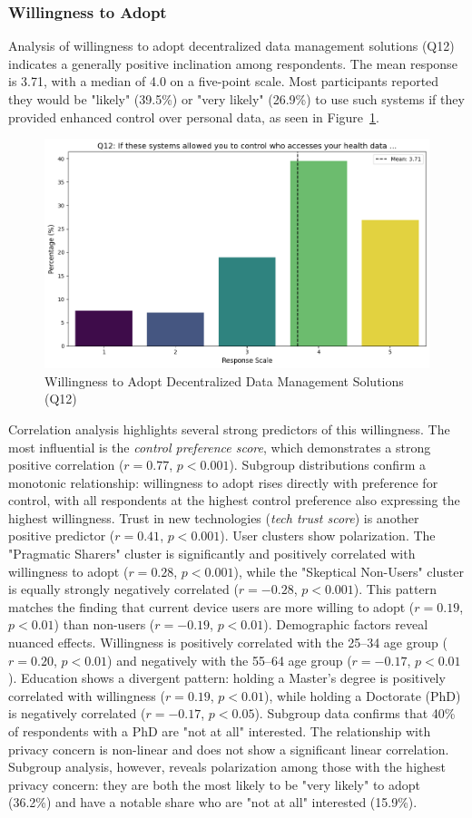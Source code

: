 	\subsubsection{Willingness to Adopt}
	Analysis of willingness to adopt decentralized data management solutions (Q12) indicates a generally positive inclination among respondents. The mean response is 3.71, with a median of 4.0 on a five-point scale. Most participants reported they would be "likely" (39.5\%) or "very likely" (26.9\%) to use such systems if they provided enhanced control over personal data, as seen in Figure~\ref{fig:Q12_willingness}.
	\begin{figure}[h!]\centering
		\includegraphics[width=0.7\linewidth]{figures/questions/Q12_likert.png}
		\caption{Willingness to Adopt Decentralized Data Management Solutions (Q12)}
		\label{fig:Q12_willingness}
	\end{figure}
	Correlation analysis highlights several strong predictors of this willingness. The most influential is the \textit{control preference score}, which demonstrates a strong positive correlation ($r = 0.77$, $p < 0.001$). Subgroup distributions confirm a monotonic relationship: willingness to adopt rises directly with preference for control, with all respondents at the highest control preference also expressing the highest willingness. Trust in new technologies (\textit{tech trust score}) is another positive predictor ($r = 0.41$, $p < 0.001$).
	User clusters show polarization. The "Pragmatic Sharers" cluster is significantly and positively correlated with willingness to adopt ($r = 0.28$, $p < 0.001$), while the "Skeptical Non-Users" cluster is equally strongly negatively correlated ($r = -0.28$, $p < 0.001$). This pattern matches the finding that current device users are more willing to adopt ($r = 0.19$, $p < 0.01$) than non-users ($r = -0.19$, $p < 0.01$).
	Demographic factors reveal nuanced effects. Willingness is positively correlated with the 25--34 age group ($r = 0.20$, $p < 0.01$) and negatively with the 55--64 age group ($r = -0.17$, $p < 0.01$). Education shows a divergent pattern: holding a Master's degree is positively correlated with willingness ($r = 0.19$, $p < 0.01$), while holding a Doctorate (PhD) is negatively correlated ($r = -0.17$, $p < 0.05$). Subgroup data confirms that 40\% of respondents with a PhD are "not at all" interested.
	The relationship with privacy concern is non-linear and does not show a significant linear correlation. Subgroup analysis, however, reveals polarization among those with the highest privacy concern: they are both the most likely to be "very likely" to adopt (36.2\%) and have a notable share who are "not at all" interested (15.9\%).

